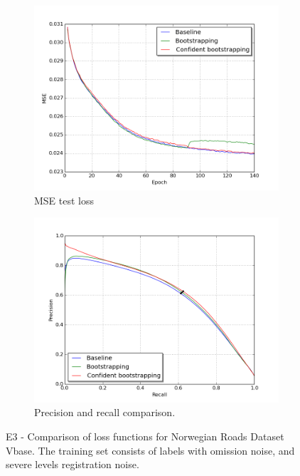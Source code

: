 \begin{figure}
\begin{subfigure}{0.48\textwidth}
\includegraphics[width=\linewidth]{figs/E4/E4_lc.png}
\caption{MSE test loss} \label{fig:E3_boot_norway_vbase_loss}
\end{subfigure}
\hspace*{\fill} %
\begin{subfigure}{0.48\textwidth}
\includegraphics[width=\linewidth]{figs/E4/E4_pr.png}
\caption{Precision and recall comparison.} \label{fig:E3_boot_norway_vbase_pr}
\end{subfigure}
\hspace*{\fill} %
\caption[E3 - Comparison of loss functions for Norwegian Roads Dataset Vbase]{E3 - Comparison of loss functions for Norwegian Roads Dataset Vbase. The training set consists of labels with omission noise, and severe levels registration noise.} \label{fig:E3_boot_norway_vbase}
\end{figure}

